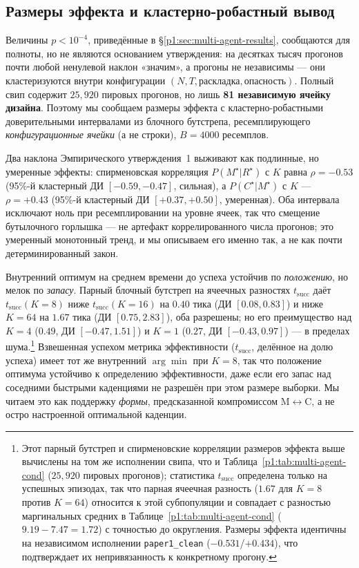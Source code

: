 \documentclass{article}
\begin{document}
\subsection{Размеры эффекта и кластерно-робастный вывод}
\label{p1:app:effect-sizes}

Величины $p<10^{-4}$, приведённые в \S\ref{p1:sec:multi-agent-results}, сообщаются для полноты, но не являются основанием утверждения: на десятках тысяч прогонов почти любой ненулевой наклон «значим», а прогоны не независимы --- они кластеризуются внутри конфигурации $(N,T,\text{раскладка},\text{опасность})$. Полный свип содержит $25{,}920$ пировых прогонов, но лишь \textbf{81 независимую ячейку дизайна}. Поэтому мы сообщаем размеры эффекта с кластерно-робастными доверительными интервалами из блочного бутстрепа, ресемплирующего \emph{конфигурационные ячейки} (а не строки), $B{=}4000$ ресемплов.

Два наклона Эмпирического утверждения~1 выживают как подлинные, но умеренные эффекты: спирменовская корреляция $P(M^\star|R^\star)$ с $K$ равна $\rho=-0.53$ (95\%-й кластерный ДИ $[-0.59,-0.47]$, сильная), а $P(C^\star|M^\star)$ с $K$ --- $\rho=+0.43$ (95\%-й кластерный ДИ $[+0.37,+0.50]$, умеренная). Оба интервала исключают ноль при ресемплировании на уровне ячеек, так что смещение бутылочного горлышка --- не артефакт коррелированного числа прогонов; это умеренный монотонный тренд, и мы описываем его именно так, а не как почти детерминированный закон.

Внутренний оптимум на среднем времени до успеха устойчив по \emph{положению}, но мелок по \emph{запасу}. Парный блочный бутстреп на ячеечных разностях $t_{\mathrm{succ}}$ даёт $t_{\mathrm{succ}}(K{=}8)$ ниже $t_{\mathrm{succ}}(K{=}16)$ на $0.40$ тика (ДИ $[0.08,0.83]$) и ниже $K{=}64$ на $1.67$ тика (ДИ $[0.75,2.83]$), оба разрешены; но его преимущество над $K{=}4$ ($0.49$, ДИ $[-0.47,1.51]$) и $K{=}1$ ($0.27$, ДИ $[-0.43,0.97]$) --- в пределах шума.\footnote{Этот парный бутстреп и спирменовские корреляции размеров эффекта выше вычислены на том же исполнении свипа, что и Таблица~\ref{p1:tab:multi-agent-cond} ($25{,}920$ пировых прогонов); статистика $t_{\mathrm{succ}}$ определена только на успешных эпизодах, так что парная ячеечная разность ($1.67$ для $K{=}8$ против $K{=}64$) относится к этой субпопуляции и совпадает с разностью маргинальных средних в Таблице~\ref{p1:tab:multi-agent-cond} ($9.19{-}7.47{=}1.72$) с точностью до округления. Размеры эффекта идентичны на независимом исполнении \texttt{paper1\_clean} ($-0.531$/$+0.434$), что подтверждает их непривязанность к конкретному прогону.} Взвешенная успехом метрика эффективности ($t_{\mathrm{succ}}$, делённое на долю успеха) имеет тот же внутренний $\arg\min$ при $K{=}8$, так что положение оптимума устойчиво к определению эффективности, даже если его запас над соседними быстрыми каденциями не разрешён при этом размере выборки. Мы читаем это как поддержку \emph{формы}, предсказанной компромиссом M$\leftrightarrow$C, а не остро настроенной оптимальной каденции.
\end{document}
